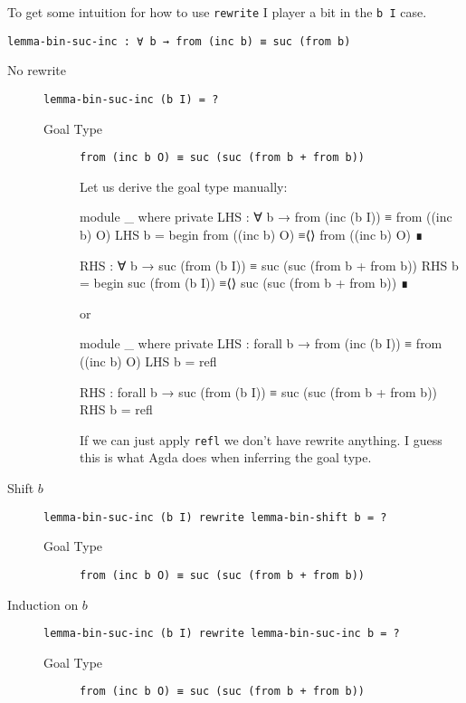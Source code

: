 To get some intuition for how to use \verb+rewrite+ I player a bit in the \verb+b I+ case.
\begin{verbatim}
lemma-bin-suc-inc : ∀ b → from (inc b) ≡ suc (from b)
\end{verbatim}

\begin{description}
\item[No rewrite] \verb+lemma-bin-suc-inc (b I) = ?+

\begin{description}
\item[Goal Type] \verb_from (inc b O) ≡ suc (suc (from b + from b))_

Let us derive the goal type manually:
\begin{code}
module _ where
  private
    LHS : ∀ b → from (inc (b I)) ≡ from ((inc b) O)
    LHS b =
      begin
        from ((inc b) O)
      ≡⟨⟩
        from ((inc b) O)
      ∎

    RHS : ∀ b → suc (from (b I)) ≡ suc (suc (from b + from b))
    RHS b =
      begin
        suc (from (b I))
      ≡⟨⟩
        suc (suc (from b + from b))
      ∎
\end{code}
or
\begin{code}
module _ where
  private
    LHS : forall b → from (inc (b I)) ≡ from ((inc b) O)
    LHS b = refl

    RHS : forall b → suc (from (b I)) ≡ suc (suc (from b + from b))
    RHS b = refl
\end{code}
If we can just apply \verb+refl+ we don’t have rewrite anything.
I guess this is what Agda does when inferring the goal type.
\end{description}

\item[Shift $b$] \verb+lemma-bin-suc-inc (b I) rewrite lemma-bin-shift b = ?+

\begin{description}
\item[Goal Type] \verb_from (inc b O) ≡ suc (suc (from b + from b))_
\end{description}

\item[Induction on $b$] \verb+lemma-bin-suc-inc (b I) rewrite lemma-bin-suc-inc b = ?+

\begin{description}
\item[Goal Type] \verb_from (inc b O) ≡ suc (suc (from b + from b))_
\end{description}


\end{description}
